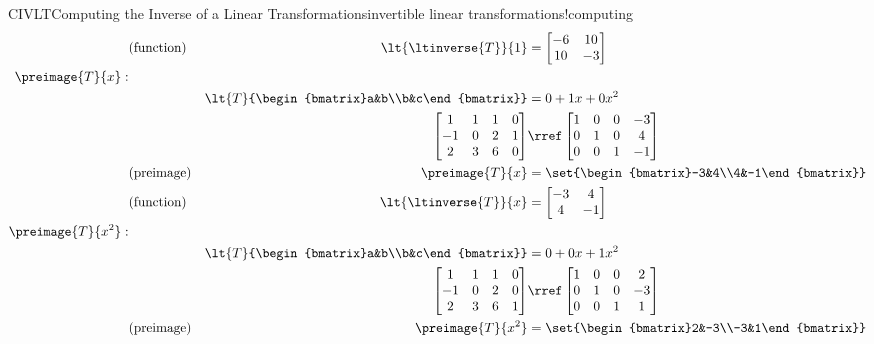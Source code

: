 \begin{example}{CIVLT}{Computing the Inverse of a Linear Transformations}{invertible linear transformations!computing}
\begin{align*}
%
&\text{(function)}&\lt{\ltinverse{T}}{1}
&=
\begin{bmatrix}-6&10\\10&-3\end{bmatrix}\\
%
%
\preimage{T}{x}:&\\
&&\lt{T}{\begin{bmatrix}a&b\\b&c\end{bmatrix}}
&=0+1x+0x^2\\
%
&&\begin{bmatrix}
 1 & 1 & 1 & 0\\
 -1 & 0 & 2 & 1\\
 2 & 3 & 6 & 0
\end{bmatrix}
&\rref
\begin{bmatrix}
1 & 0 & 0& -3 \\
0 & 1 & 0& 4 \\
0 & 0 & 1&  -1
\end{bmatrix}
\\
&\text{(preimage)}&\preimage{T}{x}
&=\set{\begin{bmatrix}-3&4\\4&-1\end{bmatrix}}\\
%
&\text{(function)}&\lt{\ltinverse{T}}{x}
&=
\begin{bmatrix}-3&4\\4&-1\end{bmatrix}\\
%
%
\preimage{T}{x^2}:&\\
&&\lt{T}{\begin{bmatrix}a&b\\b&c\end{bmatrix}}
&=0+0x+1x^2\\
%
&&\begin{bmatrix}
 1 & 1 & 1 & 0\\
 -1 & 0 & 2 & 0\\
 2 & 3 & 6 & 1
\end{bmatrix}
&\rref
\begin{bmatrix}
1 & 0 & 0& 2 \\
0 & 1 & 0& -3 \\
0 & 0 & 1&  1
\end{bmatrix}
\\
&\text{(preimage)}&\preimage{T}{x^2}
&=\set{\begin{bmatrix}2&-3\\-3&1\end{bmatrix}}\\

\end{align*}
\end{example}
